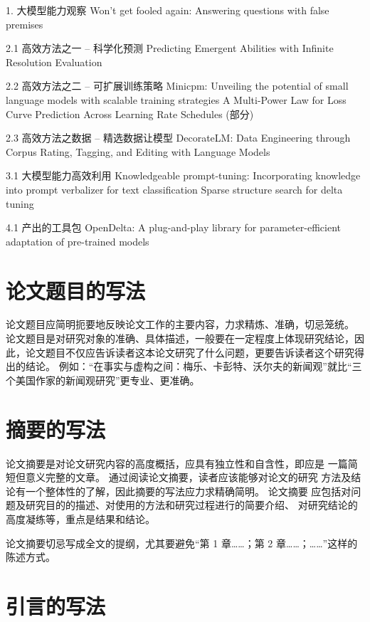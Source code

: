 1. 大模型能力观察
Won't get fooled again: Answering questions with false premises

2.1 高效方法之一 -- 科学化预测
Predicting Emergent Abilities with Infinite Resolution Evaluation

2.2 高效方法之二 -- 可扩展训练策略
Minicpm: Unveiling the potential of small language models with scalable training strategies
A Multi-Power Law for Loss Curve Prediction Across Learning Rate Schedules (部分)

2.3 高效方法之数据 -- 精选数据让模型
DecorateLM: Data Engineering through Corpus Rating, Tagging, and Editing with Language Models


3.1 大模型能力高效利用
Knowledgeable prompt-tuning: Incorporating knowledge into prompt verbalizer for text classification
Sparse structure search for delta tuning

4.1 产出的工具包
OpenDelta: A plug-and-play library for parameter-efficient adaptation of pre-trained models


\section{论文题目的写法}

论文题目应简明扼要地反映论文工作的主要内容，力求精炼、准确，切忌笼统。
论文题目是对研究对象的准确、具体描述，一般要在一定程度上体现研究结论，因此，论文题目不仅应告诉读者这本论文研究了什么问题，更要告诉读者这个研究得出的结论。
例如：“在事实与虚构之间：梅乐、卡彭特、沃尔夫的新闻观”就比“三个美国作家的新闻观研究”更专业、更准确。



\section{摘要的写法}

论文摘要是对论文研究内容的高度概括，应具有独立性和自含性，即应是 一篇简短但意义完整的文章。
通过阅读论文摘要，读者应该能够对论文的研究 方法及结论有一个整体性的了解，因此摘要的写法应力求精确简明。
论文摘要 应包括对问题及研究目的的描述、对使用的方法和研究过程进行的简要介绍、 对研究结论的高度凝练等，重点是结果和结论。

论文摘要切忌写成全文的提纲，尤其要避免“第 1 章……；第 2 章……；……”这样的陈述方式。



\section{引言的写法}

